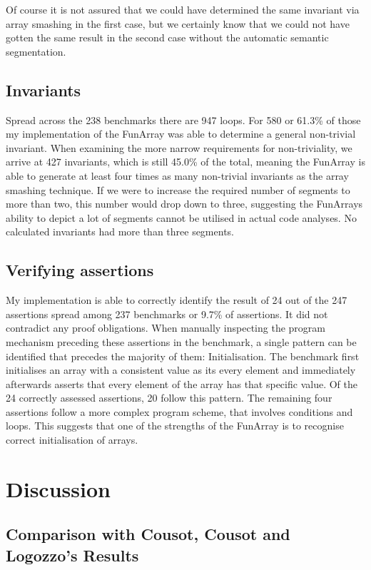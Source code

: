 \noindent Of course it is not assured that we could have determined the same invariant via array smashing in the first case, but we certainly know that we could not have gotten the same result in the second case without the automatic semantic segmentation.


\subsection{Invariants}

Spread across the 238 benchmarks there are 947 loops. For 580 or 61.3\% of those my implementation of the FunArray was able to determine a general non-trivial invariant. When examining the more narrow requirements for non-triviality, we arrive at 427 invariants, which is still 45.0\% of the total, meaning the FunArray is able to generate at least four times as many non-trivial invariants as the array smashing technique. If we were to increase the required number of segments to more than two, this number would drop down to three, suggesting the FunArrays ability to depict a lot of segments cannot be utilised in actual code analyses. No calculated invariants had more than three segments.

\subsection{Verifying assertions}

My implementation is able to correctly identify the result of 24 out of the 247 assertions spread among 237 benchmarks or 9.7\% of assertions. It did not contradict any proof obligations. When manually inspecting the program mechanism preceding these assertions in the benchmark, a single pattern can be identified that precedes the majority of them: Initialisation. The benchmark first initialises an array with a consistent value as its every element and immediately afterwards asserts that every element of the array has that specific value. Of the 24 correctly assessed assertions, 20 follow this pattern. The remaining four assertions follow a more complex program scheme, that involves conditions and loops. This suggests that one of the strengths of the FunArray is to recognise correct initialisation of arrays.



\section{Discussion}
\subsection{Comparison with Cousot, Cousot and Logozzo's Results}

